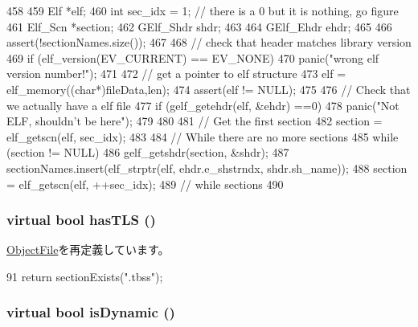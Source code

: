 \begin{DoxyCode}
458 {
459     Elf *elf;
460     int sec_idx = 1; // there is a 0 but it is nothing, go figure
461     Elf_Scn *section;
462     GElf_Shdr shdr;
463 
464     GElf_Ehdr ehdr;
465 
466     assert(!sectionNames.size());
467 
468     // check that header matches library version
469     if (elf_version(EV_CURRENT) == EV_NONE)
470         panic("wrong elf version number!");
471 
472     // get a pointer to elf structure
473     elf = elf_memory((char*)fileData,len);
474     assert(elf != NULL);
475 
476     // Check that we actually have a elf file
477     if (gelf_getehdr(elf, &ehdr) ==0) {
478         panic("Not ELF, shouldn't be here");
479     }
480 
481     // Get the first section
482     section = elf_getscn(elf, sec_idx);
483 
484     // While there are no more sections
485     while (section != NULL) {
486         gelf_getshdr(section, &shdr);
487         sectionNames.insert(elf_strptr(elf, ehdr.e_shstrndx, shdr.sh_name));
488         section = elf_getscn(elf, ++sec_idx);
489     } // while sections
490 }
\end{DoxyCode}
\hypertarget{classElfObject_a1ed34e505be8c6dabe578012e35a0317}{
\subsubsection[{hasTLS}]{\setlength{\rightskip}{0pt plus 5cm}virtual bool hasTLS ()}}
\label{classElfObject_a1ed34e505be8c6dabe578012e35a0317}


\hyperlink{classObjectFile_a1ed34e505be8c6dabe578012e35a0317}{ObjectFile}を再定義しています。


\begin{DoxyCode}
91 { return sectionExists(".tbss"); }
\end{DoxyCode}
\hypertarget{classElfObject_adeb3f3d68421f3e5f75dbbdf998a21ac}{
\subsubsection[{isDynamic}]{\setlength{\rightskip}{0pt plus 5cm}virtual bool isDynamic ()}}
\label{classElfObject_adeb3f3d68421f3e5f75dbbdf998a21ac}


